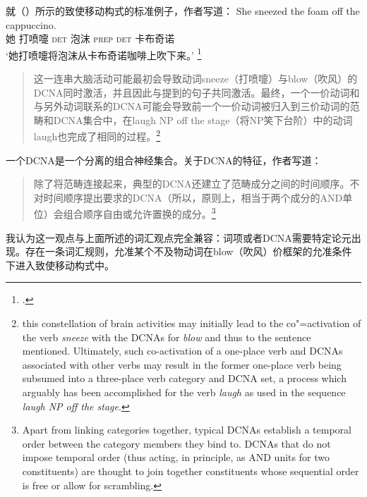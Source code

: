 \begin{exe}
\begin{xlist}[iv.]
\begin{exe}
\begin{xlist}[iv.]
就（）所示的致使移动构式的标准例子，作者写道：
\ea
\gll She sneezed the foam off the cappuccino.\\
     她 打喷嚏 \textsc{det} 泡沫 \textsc{prep} \textsc{det} 卡布奇诺\\
\glt `她打喷嚏将泡沫从卡布奇诺咖啡上吹下来。'
\footnote{%
.
}
\z
\begin{quote}
  这一连串大脑活动可能最初会导致动词sneeze（打喷嚏）与blow（吹风）的DCNA同时激活，并且因此与提到的句子共同激活。最终，一个一价动词和与另外动词联系的DCNA可能会导致前一个一价动词被归入到三价动词的范畴和DCNA集合中，在laugh NP off the stage（将NP笑下台阶）中的动词laugh也完成了相同的过程。\citep*{PCShandbookCxG}\footnote{%
  this constellation of brain activities may initially lead to the co"=activation of the verb \emph{sneeze}
  with the DCNAs for \emph{blow} and thus to the sentence mentioned. Ultimately, such co-activation of a
  one-place verb and DCNAs associated with other verbs may result in the former one-place verb being
  subsumed into a three-place verb category and DCNA set, a process which arguably has been
  accomplished for the verb \emph{laugh} as used in the sequence \emph{laugh NP off the stage}. 
  }
\end{quote}
一个DCNA是一个分离的组合神经集合。关于DCNA的特征，作者写道：
\begin{quote}
除了将范畴连接起来，典型的DCNA还建立了范畴成分之间的时间顺序。不对时间顺序提出要求的DCNA（所以，原则上，相当于两个成分的AND单位）会组合顺序自由或允许置换的成分。\citep*[]{PCShandbookCxG}\footnote{%
Apart from linking categories together, typical DCNAs establish a temporal order between the
category members they bind to. DCNAs that do not impose temporal order (thus acting, in principle,
as AND units for two constituents) are thought to join together constituents whose sequential order
is free or allow for scrambling.
}
\end{quote}
我认为这一观点与上面所述的词汇观点完全兼容：词项或者DCNA需要特定论元出现。存在一条词汇规则，允准某个不及物动词在blow（吹风）价框架的允准条件下进入致使移动构式中。


\end{xlist}
\end{exe}
\end{xlist}
\end{exe}
